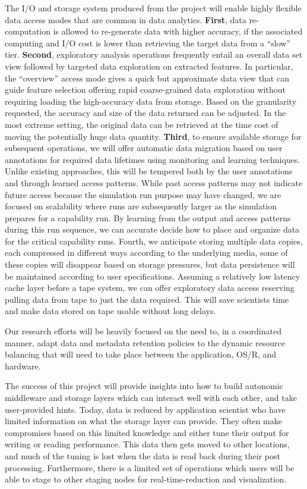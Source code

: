 \documentclass[11pt,letterpaper]{article}
\begin{document}
The I/O and storage system produced from the project will
enable highly flexible data access modes that are common in data analytics. 
\textbf{First}, data re-computation is allowed to re-generate
data with higher accuracy, if the associated computing and I/O cost is lower
than retrieving the target data from a ``slow'' tier. 
\textbf{Second}, exploratory analysis
operations frequently entail an overall data set view followed by targeted data
exploration on extracted features. 
In particular, the ``overview'' access mode gives a quick but approximate
data view that can guide feature selection offering rapid coarse-grained data
exploration without requiring loading the high-accuracy data from
storage. Based on the granularity requested, the accuracy and size of the data
returned can be adjusted. In the most extreme setting, the original data can
be retrieved at the time cost of moving the potentially huge data quantity.
\textbf{Third}, to ensure available storage for subsequent operations, we will
offer automatic data migration based on user annotations for required data
lifetimes using monitoring and learning techniques. Unlike existing approaches,
this will be tempered both by the user annotations and through learned access
patterns.  While past access patterns may not indicate future access because
the simulation run purpose may have changed, we are focused on scalability
where runs are subsequently larger as the simulation prepares for a capability
run.  By learning from the output and access patterns during this run sequence,
we can accurate decide how to place and organize data for the critical
capability runs. Fourth, we anticipate storing multiple data copies, each
compressed in different ways according to the underlying media, some of these
copies will disappear based on storage pressures, but data persistence will be
maintained according to user specifications. Assuming a relatively low latency
cache layer before a tape system, we can offer exploratory data access
reserving pulling data from tape to just the data required. This will save
scientists time and make data stored on tape usable without long delays.

Our research efforts will be heavily focused on the need to, in a coordinated
manner, adapt data and metadata retention policies to the dynamic resource
balancing that will need to take place between the application, OS/R, and
hardware.

The success of this project will  provide insights into how to build autonomic
middleware and storage layers which can interact well with each other, and take
user-provided hints. Today, data is reduced by application scientist who have
limited information on what the storage layer can provide. They often make
compromises based on this limited knowledge and either tune their output for
writing or reading performance. This data then gets moved to other locations,
and much of the tuning is lost when the data is read back during their post
processing. Furthermore, there is a limited set of operations which users will
be able to stage to other staging nodes for real-time-reduction and
visualization. 


%
\end{document}

